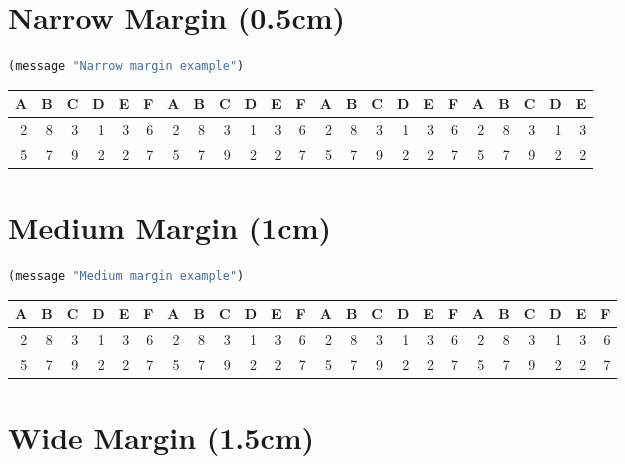 \documentclass[a4paper,oneside,toc=bibliography,toc=listof]{scrbook}
\newenvironment{narrowmargin}{
\begin{center}
\begin{adjustwidth}{-0.5cm}{-0.5cm}
}{
\end{adjustwidth}
\end{center}
}
\newenvironment{mediummargin}{
\begin{center}
\begin{adjustwidth}{-1cm}{-1cm}
}{
\end{adjustwidth}
\end{center}
}
\begin{document}
\section{Narrow Margin (0.5cm)}
\label{sec:org6765ce8}

\begin{narrowmargin}
\begin{lstlisting}[language=Lisp,numbers=none]
  (message "Narrow margin example")
\end{lstlisting}

\begin{center}
\begin{tabular}{rrrrrrrrrrrrrrrrrrrrrrr}
A & B & C & D & E & F & A & B & C & D & E & F & A & B & C & D & E & F & A & B & C & D & E\\
\hline
2 & 8 & 3 & 1 & 3 & 6 & 2 & 8 & 3 & 1 & 3 & 6 & 2 & 8 & 3 & 1 & 3 & 6 & 2 & 8 & 3 & 1 & 3\\
5 & 7 & 9 & 2 & 2 & 7 & 5 & 7 & 9 & 2 & 2 & 7 & 5 & 7 & 9 & 2 & 2 & 7 & 5 & 7 & 9 & 2 & 2\\
\end{tabular}
\end{center}
\end{narrowmargin}
\section{Medium Margin (1cm)}
\label{sec:org5632077}

\begin{mediummargin}
\begin{lstlisting}[language=Lisp,numbers=none]
  (message "Medium margin example")
\end{lstlisting}

\begin{center}
\begin{tabular}{rrrrrrrrrrrrrrrrrrrrrrrr}
A & B & C & D & E & F & A & B & C & D & E & F & A & B & C & D & E & F & A & B & C & D & E & F\\
\hline
2 & 8 & 3 & 1 & 3 & 6 & 2 & 8 & 3 & 1 & 3 & 6 & 2 & 8 & 3 & 1 & 3 & 6 & 2 & 8 & 3 & 1 & 3 & 6\\
5 & 7 & 9 & 2 & 2 & 7 & 5 & 7 & 9 & 2 & 2 & 7 & 5 & 7 & 9 & 2 & 2 & 7 & 5 & 7 & 9 & 2 & 2 & 7\\
\end{tabular}
\end{center}
\end{mediummargin}
\section{Wide Margin (1.5cm)}
\label{sec:orgcc412d2}
\end{document}
